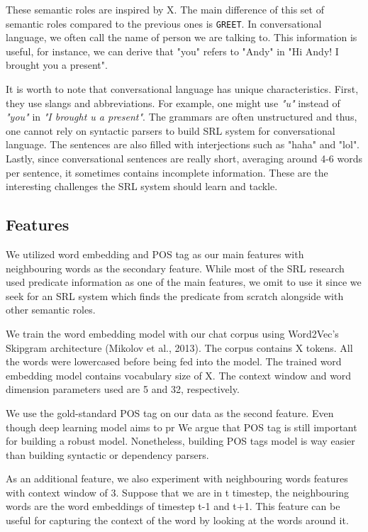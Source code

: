 These semantic roles are inspired by X. The main difference of this set of semantic roles compared to the previous ones is \texttt{GREET}. In conversational language, we often call the name of person we are talking to. This information is useful, for instance, we can derive that "you" refers to "Andy" in "Hi Andy! I brought you a present".

It is worth to note that conversational language has unique characteristics. First, they use slangs and abbreviations. For example, one might use \textit{"u"} instead of \textit{"you"} in \textit{"I brought u a present"}. The grammars are often unstructured and thus, one cannot rely on syntactic parsers to build SRL system for conversational language. The sentences are also filled with interjections such as "haha" and "lol". Lastly, since conversational sentences are really short, averaging around 4-6 words per sentence, it sometimes contains incomplete information. These are the interesting challenges the SRL system should learn and tackle.

\subsection{Features}
We utilized word embedding and POS tag as our main features with neighbouring words as the secondary feature. While most of the SRL research used predicate information as one of the main features, we omit to use it since we seek for an SRL system which finds the predicate from scratch alongside with other semantic roles.

We train the word embedding model with our chat corpus using Word2Vec’s Skipgram architecture (Mikolov et al., 2013). The corpus contains X tokens. All the words were lowercased before being fed into the model. The trained word embedding model contains vocabulary size of X. The context window and word dimension parameters used are 5 and 32, respectively.

We use the gold-standard POS tag on our data as the second feature. Even though deep learning model aims to pr We argue that POS tag is still important for building a robust model. Nonetheless, building POS tags model is way easier than building syntactic or dependency parsers.

As an additional feature, we also experiment with neighbouring words features with context window of 3. Suppose that we are in t timestep, the neighbouring words are the word embeddings of timestep t-1 and t+1. This feature can be useful for capturing the context of the word by looking at the words around it.

